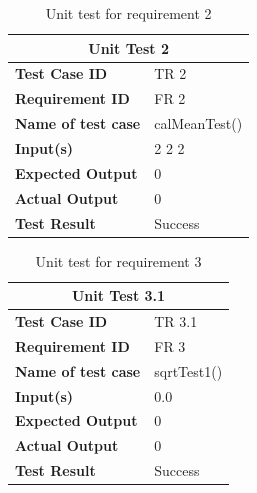 \documentclass{scrartcl}
\begin{document}
\begin{table}[H]
\begin{Large}
\begin{center}
\begin{tabular}{ | m{10em} | m{10em} | } 
  \hline
  \multicolumn{2}{|c|}{\textbf {Unit Test 2}} \\ 
  \hline
  \textbf{Test Case ID}  &  TR 2\\ 
  \hline
  \textbf{Requirement ID} &  FR 2\\
  \hline
  \textbf{Name of test case} & calMeanTest()\\
  \hline
  \textbf{Input(s) } &  2 2 2 \\
  \hline
  \textbf{Expected Output } & 0\\
  \hline
  \textbf{Actual Output } & 0\\
  \hline
  \textbf{Test Result } & Success \\
 \hline
\end{tabular}
\caption{Unit test for requirement 2}
\label{table:unit test 2}
\end{center}
\end{Large}
\end{table}

\begin{table}[H]
\begin{Large}
\begin{center}
\begin{tabular}{ | m{10em} | m{10em} | } 
  \hline
  \multicolumn{2}{|c|}{\textbf {Unit Test 3.1}} \\ 
  \hline
  \textbf{Test Case ID}  &  TR 3.1\\ 
  \hline
  \textbf{Requirement ID} &  FR 3\\
  \hline
  \textbf{Name of test case} & sqrtTest1()\\
  \hline
  \textbf{Input(s) } &  0.0 \\
  \hline
  \textbf{Expected Output } & 0\\
  \hline
  \textbf{Actual Output } & 0\\
  \hline
  \textbf{Test Result } & Success \\
 \hline
\end{tabular}
\caption{Unit test for requirement 3}
\label{table:unit test 3.1}
\end{center}
\end{Large}
\end{table}
\end{document}
